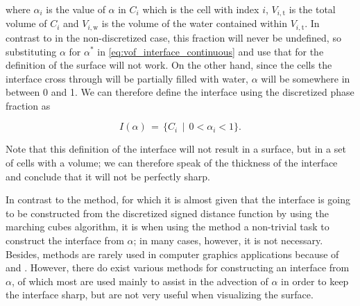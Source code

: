 where $\alpha_i$ is the value of $\alpha$ in $C_i$ which is the cell with index $i$, $V_{i,\text{t}}$ is the total volume of $C_i$ and $V_{i,\text{w}}$ is the volume of the water contained within $V_{i,\text{t}}$. In contrast to in the non-discretized case, this fraction will never be undefined, so substituting $\alpha$ for $\alpha^*$ in \eqref{eq:vof_interface_continuous} and use that for the definition of the surface will not work. On the other hand, since the cells the interface cross through will be partially filled with water, $\alpha$ will be somewhere in between 0 and 1. We can therefore define the interface using the discretized phase fraction as

\begin{equation} \label{eq:vof_interface_discrete}
I(\alpha) \,=\, \{C_i \,\mid\, 0 < \alpha_i < 1\}.
\end{equation}

Note that this definition of the interface will not result in a surface, but in a set of cells with a volume; we can therefore speak of the thickness of the interface and conclude that it will not be perfectly sharp.

In contrast to the \LS method, for which it is almost given that the interface is going to be constructed from the discretized signed distance function by using the marching cubes algorithm, it is when using the \VOF method a non-trivial task to construct the interface from $\alpha$; in many cases, however, it is not necessary. Besides, \VOF methods are rarely used in computer graphics applications because of  and  \citep{Wojtan2009}. However, there do exist various methods for constructing an interface from $\alpha$, of which most are used mainly to assist in the advection of $\alpha$ in order to keep the interface sharp, but are not very useful when visualizing the surface.



